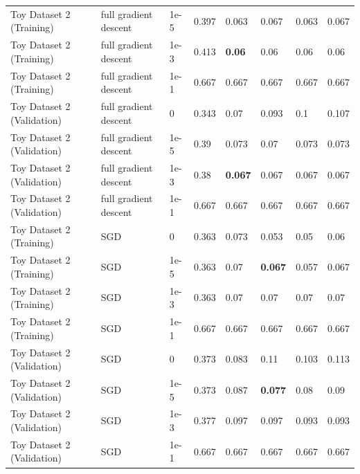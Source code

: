 \documentclass[10pt]{article}
\begin{document}
\begin{table}
\begin{tabular}{llllllll}
Toy Dataset 2 (Training) & full gradient descent & 1e-5 &   0.397 & 0.063 & 0.067 & 0.063 & 0.067 \\
Toy Dataset 2 (Training) & full gradient descent & 1e-3 &  0.413 & \bf{0.06}  & 0.06  & 0.06  & 0.06  \\
Toy Dataset 2 (Training) & full gradient descent & 1e-1 &  0.667 & 0.667 & 0.667 & 0.667 & 0.667 \\
\midrule
Toy Dataset 2 (Validation) & full gradient descent & 0 &      0.343 & 0.07  & 0.093 & 0.1   & 0.107 \\
Toy Dataset 2 (Validation) & full gradient descent & 1e-5 &   0.39  & 0.073 & 0.07  & 0.073 & 0.073 \\
Toy Dataset 2 (Validation) & full gradient descent & 1e-3 &  0.38  & \bf{0.067} & 0.067 & 0.067 & 0.067 \\
Toy Dataset 2 (Validation) & full gradient descent & 1e-1 &  0.667 & 0.667 & 0.667 & 0.667 & 0.667 \\
\midrule
Toy Dataset 2 (Training) & SGD & 0 &       0.363 & 0.073 & 0.053 & 0.05  & 0.06  \\
Toy Dataset 2 (Training) & SGD & 1e-5 &   0.363 & 0.07  & \bf{0.067} & 0.057 & 0.067 \\
Toy Dataset 2 (Training) & SGD & 1e-3 &   0.363 & 0.07  & 0.07  & 0.07  & 0.07  \\
Toy Dataset 2 (Training) & SGD & 1e-1 &   0.667 & 0.667 & 0.667 & 0.667 & 0.667 \\
\midrule
Toy Dataset 2 (Validation) & SGD & 0 &       0.373 & 0.083 & 0.11  & 0.103 & 0.113 \\
Toy Dataset 2 (Validation) & SGD & 1e-5 &   0.373 & 0.087 & \bf{0.077} & 0.08  & 0.09  \\
Toy Dataset 2 (Validation) & SGD & 1e-3 &   0.377 & 0.097 & 0.097 & 0.093 & 0.093 \\
Toy Dataset 2 (Validation) & SGD & 1e-1 &   0.667 & 0.667 & 0.667 & 0.667 & 0.667 \\
\bottomrule
\end{tabular}
\end{table}
\end{document}
